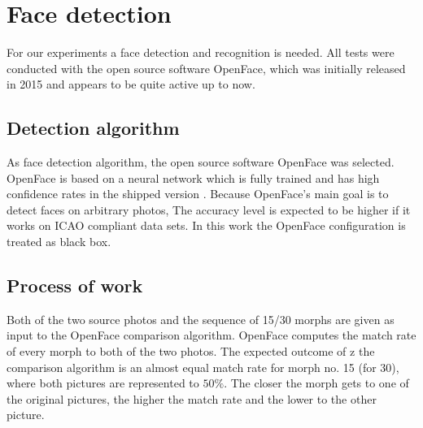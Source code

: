 \section{Face detection}
\label{detection}
For our experiments a face detection and recognition is needed. All tests were conducted with the open source software OpenFace, which was initially released in 2015 and  appears to be quite active\cite{amos2016openface} up to now.

\subsection{Detection algorithm} %
As face detection algorithm, the open source software OpenFace was selected. OpenFace is based on a neural network which is fully trained and has high confidence rates in the shipped version \cite{baltruvsaitis2016openface}. Because OpenFace's main goal is to detect faces on arbitrary photos, The accuracy level is expected to be higher if it works on ICAO compliant data sets. 
In this work the OpenFace configuration is treated as black box.


\subsection{Process of work}
Both of the two source photos and the sequence of 15/30 morphs are given as input to the OpenFace comparison algorithm. OpenFace computes the match rate of every morph to both of the two photos. 
The expected outcome of z
the comparison algorithm is an almost equal match rate for morph no. 15 (for 30), where both pictures are represented to $50\%$. The closer the morph gets to one of the original pictures, the higher the match rate and the lower to the other picture. 

